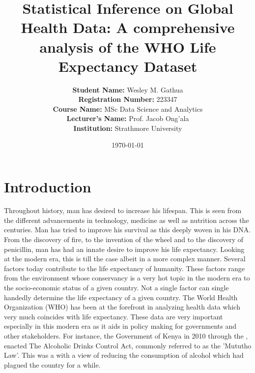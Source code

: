 \documentclass[3pt, a4paper]{article}
\title{\textbf{Statistical Inference on Global Health Data: A comprehensive analysis of the WHO Life Expectancy Dataset}}
\author{
    \textbf{Student Name:} Wesley M. Gathua \\
    \textbf{Registration Number:} 223347 \\
    \textbf{Course Name:} MSc Data Science and Analytics \\
    \textbf{Lecturer's Name:} Prof. Jacob Ong'ala \\
    \textbf{Institution:} Strathmore University \\
}
\date{\today}
\begin{document}

\maketitle

\thispagestyle{empty}

\newpage

\tableofcontents
\newpage


\section{Introduction}
\indent Throughout history, man has desired to increase his lifespan. This is seen from the different advancements in technology, medicine as well as nutrition across the centuries. Man has tried to improve his survival as this deeply woven in his DNA. From the discovery of fire, to the invention of the wheel and to the discovery of penicillin, man has had an innate desire to improve his life expectancy. Looking at the modern era, this is till the case albeit in a more complex manner. Several factors today contribute to the life expectancy of humanity. These factors range from the environment whose conservancy is a very hot topic in the modern era to the socio-economic status of a given country. Not a single factor can single handedly determine the life expectancy of a given country. The World Health Organization (WHO) has been at the forefront in analyzing health data which very much coincides with life expectancy. These data are very important especially in this modern era as it aids in policy making for governments and other stakeholders. For instance, the Government of Kenya in 2010 through the \citet{kenya_alcohol_act_2010}, enacted The Alcoholic Drinks Control Act, commonly referred to as the 'Mututho Law'. This was a with a view of reducing the consumption of alcohol which had plagued the country for a while.
\end{document}
